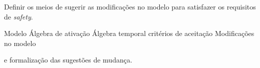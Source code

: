 \documentclass[a5paper,portuges]{article}
\begin{document}
\begin{artigo}
\label{sec:modificacao-modelo}
\begin{objetivo}
Definir os meios de sugerir as modificações no modelo para satisfazer os requisitos de \emph{safety}.
\end{objetivo}

\begin{fluxo}
Modelo \passofluxo Álgebra de ativação \passofluxo Álgebra temporal \passofluxo critérios de aceitação \passofluxo Modificações no modelo
\end{fluxo}

\begin{paraconseguir}
 e formalização das sugestões de mudança.
\end{paraconseguir}

\begin{submissao}
  \item 
\end{submissao}
\end{artigo}
\end{document}

